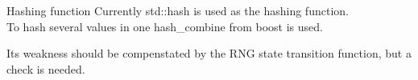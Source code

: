 \documentclass[aspectratio=169, 14pt]{beamer}
\begin{document}
\begin{large}
  
 \begin{frame}{Hashing function}
  Currently std::hash is used as the hashing function.\\
  To hash several values in one hash\_combine from boost is used.
  
  
  Its weakness should be compenstated by the RNG state transition function,
  but a check is needed.
 \end{frame}
 
 
 
 \end{large}
\end{document}
